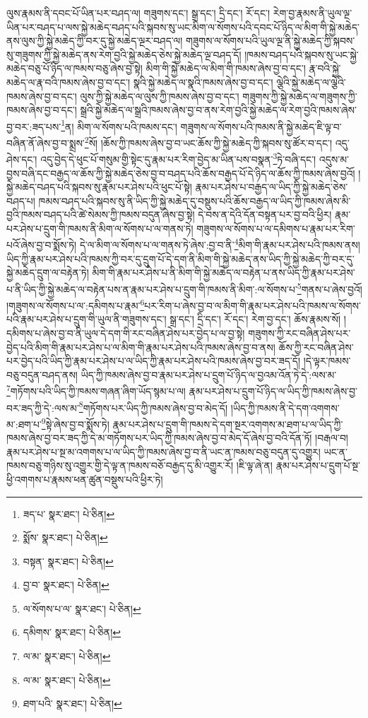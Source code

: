 ལུས་རྣམས་ནི་དབང་པོ་ཡིན་པར་བཤད་ལ། གཟུགས་དང་། སྒྲ་དང་། དྲི་དང་། རོ་དང་། རེག་བྱ་རྣམས་ནི་ཡུལ་ལྔ་ཡིན་པར་བཤད་པ་ལས་སྐྱེ་མཆེད་བཤད་པའི་སྐབས་སུ་ཡང་མིག་ལ་སོགས་པའི་དབང་པོ་ཉིད་ལ་མིག་གི་སྐྱེ་མཆེད་ནས་ལུས་ཀྱི་སྐྱེ་མཆེད་ཀྱི་བར་དུ་སྐྱེ་མཆེད་ལྔར་བཤད་ལ། གཟུགས་ལ་སོགས་པའི་ཡུལ་ལྔ་ནི་སྐྱེ་མཆེད་ཀྱི་སྐབས་སུ་གཟུགས་ཀྱི་སྐྱེ་མཆེད་ནས་རེག་བྱའི་སྐྱེ་མཆེད་ཅེས་སྐྱེ་མཆེད་ལྔ་བཤད་དོ། །ཁམས་བཤད་པའི་སྐབས་སུ་ཡང་སྐྱེ་མཆེད་བཅུ་པོ་ཉིད་ལ་ཁམས་བཅུ་ཞེས་བྱ་སྟེ། མིག་གི་སྐྱེ་མཆེད་ལ་མིག་གི་ཁམས་ཞེས་བྱ་བ་དང་། རྣ་བའི་སྐྱེ་མཆེད་ལ་རྣ་བའི་ཁམས་ཞེས་བྱ་བ་དང་། སྣའི་སྐྱེ་མཆེད་ལ་སྣའི་ཁམས་ཞེས་བྱ་བ་དང་། ལྕེའི་སྐྱེ་མཆེད་ལ་ལྕེའི་ཁམས་ཞེས་བྱ་བ་དང་། ལུས་ཀྱི་སྐྱེ་མཆེད་ལ་ལུས་ཀྱི་ཁམས་ཞེས་བྱ་བ་དང་། གཟུགས་ཀྱི་སྐྱེ་མཆེད་ལ་གཟུགས་ཀྱི་ཁམས་ཞེས་བྱ་བ་དང་། སྒྲའི་སྐྱེ་མཆེད་ལ་སྒྲའི་ཁམས་ཞེས་བྱ་བ་ནས་རེག་བྱའི་སྐྱེ་མཆེད་ལ་རེག་བྱའི་ཁམས་ཞེས་བྱ་བར་:ཟད་པས་\footnote{ཟད་པ་  སྣར་ཐང་།  པེ་ཅིན། }ན། མིག་ལ་སོགས་པའི་ཁམས་དང་། གཟུགས་ལ་སོགས་པའི་ཁམས་ནི་སྐྱེ་མཆེད་ཇི་ལྟ་བ་བཞིན་ནོ་ཞེས་བྱ་བ་སྨྲས་\footnote{སྨོས་  སྣར་ཐང་།  པེ་ཅིན། }སོ། །ཆོས་ཀྱི་ཁམས་ཞེས་བྱ་བ་ཡང་ཆོས་ཀྱི་སྐྱེ་མཆེད་ཀྱི་སྐབས་སུ་ཚོར་བ་དང་། འདུ་ཤེས་དང་། འདུ་བྱེད་དེ་ཕུང་པོ་གསུམ་གྱི་སྟེང་དུ་རྣམ་པར་རིག་བྱེད་མ་ཡིན་པས་བསྣན་\footnote{བསྟན་  སྣར་ཐང་།  པེ་ཅིན། }ཏེ་བཞི་དང་། འདུས་མ་བྱས་བཞི་དང་བརྒྱད་ལ་ཆོས་ཀྱི་སྐྱེ་མཆེད་ཅེས་བྱ་བ་བཤད་པའི་ཆོས་བརྒྱད་པོ་དེ་ཉིད་ལ་ཆོས་ཀྱི་ཁམས་ཞེས་བྱའོ། །སྐྱེ་མཆེད་བཤད་པའི་སྐབས་སུ་རྣམ་པར་ཤེས་པའི་ཕུང་པོ་སྟེ། རྣམ་པར་ཤེས་པ་བརྒྱད་ལ་ཡིད་ཀྱི་སྐྱེ་མཆེད་ཅེས་བཤད་པ། ཁམས་བཤད་པའི་སྐབས་སུ་ནི་ཡིད་ཀྱི་སྐྱེ་མཆེད་དུ་བསྡུས་པའི་ཆོས་བརྒྱད་ལ་ཡིད་ཀྱི་ཁམས་ཞེས་མི་བྱའི་ཁམས་བཤད་པའི་ཚེ་སེམས་ཀྱི་ཁམས་བདུན་ཞེས་བྱ་སྟེ། དེ་བས་ན་དེའི་དོན་བསྟན་པར་བྱ་བའི་ཕྱིར། རྣམ་པར་ཤེས་པ་དྲུག་གི་ཁམས་ནི་མིག་ལ་སོགས་པ་ལ་གནས་ཏེ། གཟུགས་ལ་སོགས་པ་ལ་དམིགས་པ་རྣམ་པར་རིག་པའོ་ཞེས་བྱ་བ་སྨོས་ཏེ། དེ་ལ་མིག་ལ་སོགས་པ་ལ་གནས་ཏེ་ཞེས་:བྱ་བ་ནི་\footnote{བྱ་བ་  སྣར་ཐང་།  པེ་ཅིན། }མིག་གི་རྣམ་པར་ཤེས་པའི་ཁམས་ནས། ཡིད་ཀྱི་རྣམ་པར་ཤེས་པའི་ཁམས་ཀྱི་བར་དུ་དྲུག་པོ་དེ་དག་ནི་མིག་གི་སྐྱེ་མཆེད་ནས་ཡིད་ཀྱི་སྐྱེ་མཆེད་ཀྱི་བར་དུ་སྐྱེ་མཆེད་དྲུག་ལ་བརྟེན་ཏེ། མིག་གི་རྣམ་པར་ཤེས་པ་ནི་མིག་གི་སྐྱེ་མཆེད་ལ་བརྟེན་པ་ནས་ཡིད་ཀྱི་རྣམ་པར་ཤེས་པ་ནི་ཡིད་ཀྱི་སྐྱེ་མཆེད་ལ་བརྟེན་པས་ན་རྣམ་པར་ཤེས་པ་དྲུག་གི་ཁམས་ནི་མིག་:ལ་སོགས་པ་\footnote{ལ་སོགས་པ་ལ་  སྣར་ཐང་།  པེ་ཅིན། }གནས་པ་ཞེས་བྱའོ། །གཟུགས་ལ་སོགས་པ་ལ་:དམིགས་པ་རྣམ་\footnote{དམིགས་  སྣར་ཐང་།  པེ་ཅིན། }པར་རིག་པ་ཞེས་བྱ་བ་ལ་མིག་གི་རྣམ་པར་ཤེས་པའི་ཁམས་ལ་སོགས་པའི་རྣམ་པར་ཤེས་པ་དྲུག་གི་ཡུལ་ནི་གཟུགས་དང་། སྒྲ་དང་། དྲི་དང་། རོ་དང་། རེག་བྱ་དང་། ཆོས་རྣམས་སོ། །དམིགས་པ་ཞེས་བྱ་བ་ནི་ཡུལ་དེ་དག་གི་རང་བཞིན་ཤེས་པར་བྱེད་པ་ལ་བྱ་སྟེ། གཟུགས་ཀྱི་རང་བཞིན་ཤེས་པར་བྱེད་པའི་མིག་གི་རྣམ་པར་ཤེས་པ་ལ་མིག་གི་རྣམ་པར་ཤེས་པའི་ཁམས་ཞེས་བྱ་བ་ནས། ཆོས་ཀྱི་རང་བཞིན་ཤེས་པར་བྱེད་པའི་ཡིད་ཀྱི་རྣམ་པར་ཤེས་པ་ལ་ཡིད་ཀྱི་རྣམ་པར་ཤེས་པའི་ཁམས་ཞེས་བྱ་བར་ཟད་དོ། །དེ་ལྟར་ཁམས་བཅུ་བདུན་བཤད་ནས། ཡིད་ཀྱི་ཁམས་ཞེས་བྱ་བ་རྣམ་པར་ཤེས་པ་དྲུག་པོ་ཉིད་ལ་བྱའམ་འོན་ཏེ་དེ་:ལས་མ་\footnote{ལ་མ་  སྣར་ཐང་།  པེ་ཅིན། }གཏོགས་པའི་ཡིད་ཀྱི་ཁམས་གཞན་ཞིག་ཡོད་སྙམ་པ་ལ། རྣམ་པར་ཤེས་པ་དྲུག་པོ་ཉིད་ལ་ཡིད་ཀྱི་ཁམས་ཞེས་བྱ་བར་ཟད་ཀྱི་དེ་:ལས་མ་\footnote{ལ་མ་  སྣར་ཐང་།  པེ་ཅིན། }གཏོགས་པར་ཡིད་ཀྱི་ཁམས་ཞེས་བྱ་བ་མེད་དོ། །ཡིད་ཀྱི་ཁམས་ནི་དེ་དག་འགགས་མ་:ཐག་པ་\footnote{ཐག་པའི་  སྣར་ཐང་།  པེ་ཅིན། }སྟེ་ཞེས་བྱ་བ་སྨོས་ཏེ། རྣམ་པར་ཤེས་པ་དྲུག་གི་ཁམས་དེ་དག་སྔར་འགགས་མ་ཐག་པ་ལ་ཡིད་ཀྱི་ཁམས་ཞེས་བྱ་བར་ཟད་ཀྱི་དེ་མ་གཏོགས་པར་ཡིད་ཀྱི་ཁམས་ཞེས་བྱ་བ་མེད་དོ་ཞེས་བྱ་བའི་དོན་ཏོ། །བརྒལ་བ། རྣམ་པར་ཤེས་པ་སྔ་མ་འགགས་པ་ལ་ཡིད་ཀྱི་ཁམས་ཞེས་བྱ་བ་ནི་ཡང་ན་ཁམས་བཅུ་བདུན་དུ་འགྱུར། ཡང་ན་ཁམས་བཅུ་གཉིས་སུ་འགྱུར་གྱི་དེ་ལྟ་ན་ཁམས་བཅོ་བརྒྱད་དུ་མི་འགྱུར་རོ། །ཇི་ལྟ་ཞེ་ན། རྣམ་པར་ཤེས་པ་དྲུག་པོ་སྔ་ཕྱི་འགགས་པ་རྣམས་ཕན་ཚུན་བསྡུས་པའི་ཕྱིར་ཏེ། 